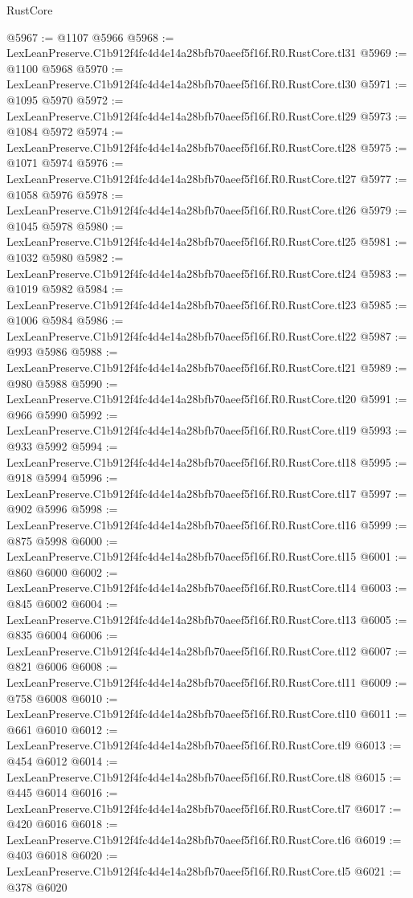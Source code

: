 \begin{lexlean}{RustCore}
\begin{coremodule}
@5967 := @1107 @5966
@5968 := LexLeanPreserve.C1b912f4fc4d4e14a28bfb70aeef5f16f.R0.RustCore.tl31
@5969 := @1100 @5968
@5970 := LexLeanPreserve.C1b912f4fc4d4e14a28bfb70aeef5f16f.R0.RustCore.tl30
@5971 := @1095 @5970
@5972 := LexLeanPreserve.C1b912f4fc4d4e14a28bfb70aeef5f16f.R0.RustCore.tl29
@5973 := @1084 @5972
@5974 := LexLeanPreserve.C1b912f4fc4d4e14a28bfb70aeef5f16f.R0.RustCore.tl28
@5975 := @1071 @5974
@5976 := LexLeanPreserve.C1b912f4fc4d4e14a28bfb70aeef5f16f.R0.RustCore.tl27
@5977 := @1058 @5976
@5978 := LexLeanPreserve.C1b912f4fc4d4e14a28bfb70aeef5f16f.R0.RustCore.tl26
@5979 := @1045 @5978
@5980 := LexLeanPreserve.C1b912f4fc4d4e14a28bfb70aeef5f16f.R0.RustCore.tl25
@5981 := @1032 @5980
@5982 := LexLeanPreserve.C1b912f4fc4d4e14a28bfb70aeef5f16f.R0.RustCore.tl24
@5983 := @1019 @5982
@5984 := LexLeanPreserve.C1b912f4fc4d4e14a28bfb70aeef5f16f.R0.RustCore.tl23
@5985 := @1006 @5984
@5986 := LexLeanPreserve.C1b912f4fc4d4e14a28bfb70aeef5f16f.R0.RustCore.tl22
@5987 := @993 @5986
@5988 := LexLeanPreserve.C1b912f4fc4d4e14a28bfb70aeef5f16f.R0.RustCore.tl21
@5989 := @980 @5988
@5990 := LexLeanPreserve.C1b912f4fc4d4e14a28bfb70aeef5f16f.R0.RustCore.tl20
@5991 := @966 @5990
@5992 := LexLeanPreserve.C1b912f4fc4d4e14a28bfb70aeef5f16f.R0.RustCore.tl19
@5993 := @933 @5992
@5994 := LexLeanPreserve.C1b912f4fc4d4e14a28bfb70aeef5f16f.R0.RustCore.tl18
@5995 := @918 @5994
@5996 := LexLeanPreserve.C1b912f4fc4d4e14a28bfb70aeef5f16f.R0.RustCore.tl17
@5997 := @902 @5996
@5998 := LexLeanPreserve.C1b912f4fc4d4e14a28bfb70aeef5f16f.R0.RustCore.tl16
@5999 := @875 @5998
@6000 := LexLeanPreserve.C1b912f4fc4d4e14a28bfb70aeef5f16f.R0.RustCore.tl15
@6001 := @860 @6000
@6002 := LexLeanPreserve.C1b912f4fc4d4e14a28bfb70aeef5f16f.R0.RustCore.tl14
@6003 := @845 @6002
@6004 := LexLeanPreserve.C1b912f4fc4d4e14a28bfb70aeef5f16f.R0.RustCore.tl13
@6005 := @835 @6004
@6006 := LexLeanPreserve.C1b912f4fc4d4e14a28bfb70aeef5f16f.R0.RustCore.tl12
@6007 := @821 @6006
@6008 := LexLeanPreserve.C1b912f4fc4d4e14a28bfb70aeef5f16f.R0.RustCore.tl11
@6009 := @758 @6008
@6010 := LexLeanPreserve.C1b912f4fc4d4e14a28bfb70aeef5f16f.R0.RustCore.tl10
@6011 := @661 @6010
@6012 := LexLeanPreserve.C1b912f4fc4d4e14a28bfb70aeef5f16f.R0.RustCore.tl9
@6013 := @454 @6012
@6014 := LexLeanPreserve.C1b912f4fc4d4e14a28bfb70aeef5f16f.R0.RustCore.tl8
@6015 := @445 @6014
@6016 := LexLeanPreserve.C1b912f4fc4d4e14a28bfb70aeef5f16f.R0.RustCore.tl7
@6017 := @420 @6016
@6018 := LexLeanPreserve.C1b912f4fc4d4e14a28bfb70aeef5f16f.R0.RustCore.tl6
@6019 := @403 @6018
@6020 := LexLeanPreserve.C1b912f4fc4d4e14a28bfb70aeef5f16f.R0.RustCore.tl5
@6021 := @378 @6020

\end{coremodule}
\end{lexlean}
